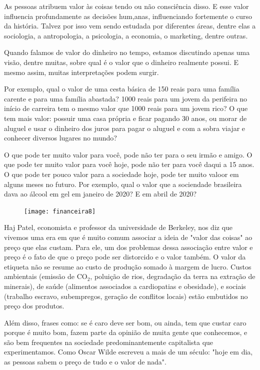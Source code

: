 \begin{reflection}
As pessoas atribuem valor às coisas tendo ou não consciência disso. E esse valor influencia profundamente as decisões hum,anas, influenciando fortemente o curso da história. Talvez por isso vem sendo estudada por diferentes áreas, dentre elas a sociologia, a antropologia, a psicologia, a economia, o marketing, dentre outras.

Quando falamos de valor do dinheiro no tempo, estamos discutindo apenas uma visão, dentre muitas, sobre qual é o valor que o dinheiro realmente possui. E mesmo assim, muitas interpretações podem surgir.

Por exemplo, qual o valor de uma cesta básica de 150 reais para uma família carente e para uma família abastada? 1000 reais para um jovem da perifeira no início de carreira tem o mesmo valor que 1000 reais para um jovem rico? O que tem mais valor: possuir uma casa própria e ficar pagando 30 anos, ou morar de aluguel e usar o dinheiro dos juros para pagar o aluguel e com a sobra viajar e conhecer diversos lugares no mundo?

O que pode ter muito valor para você, pode não ter para o seu irmão e amigo. O que pode ter muito valor para você hoje, pode não ter para você daqui a 15 anos. O que pode ter pouco valor para a sociedade hoje, pode ter muito valoor em alguns meses no futuro. Por exemplo, qual o valor que a sociendade brasileira dava ao álcool em gel em janeiro de 2020? E em abril de 2020?

\begin{figure}
\vspace{-1.1em}
\texttt{[image: financeira8]}
\end{figure}

Haj Patel, economista e professor da universidade de Berkeley, nos diz que vivemos uma era em que é muito comum associar a ideia de "valor das coisas" ao preço que elas custam. Para ele, um dos problemas dessa associação entre valor e preço é o fato de que o preço pode ser distorcido e o valor também. O valor da etiqueta não se resume ao custo de produção somado à margem de lucro. Custos ambientais (emissão de CO$_{\text{2}}$, poluição de rios, degradação da terra na extração de minerais), de saúde (alimentos associados a cardiopatias e obesidade), e sociais (trabalho escravo, subempregos, geração de conflitos locais) estão embutidos no preço dos produtos.

Além disso, frases como: se é caro deve ser bom, ou ainda, tem que custar caro porque é muito bom, fazem parte da opinião de muita gente que conhecemos, e são bem frequentes na sociedade predominantemente capitalista que experimentamos. Como Oscar Wilde escreveu a mais de um século: "hoje em dia, as pessoas sabem o preço de tudo e o valor de nada".


\end{reflection}
